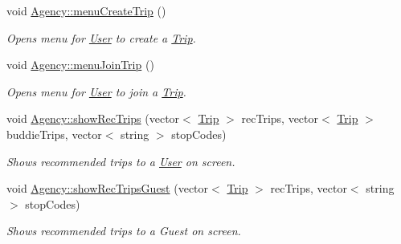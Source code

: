 \begin{DoxyCompactItemize}
\mbox{\label{group___agency_ga07c72d02ed02eac58a0624feb7fccea8}} 
void \hyperlink{group___agency_ga07c72d02ed02eac58a0624feb7fccea8}{Agency\+::menu\+Create\+Trip} ()
\begin{DoxyCompactList}\small\item\em Opens menu for \hyperlink{class_user}{User} to create a \hyperlink{class_trip}{Trip}. \end{DoxyCompactList}\item 
\mbox{\label{group___agency_gab83663afe4fceea7def561cbf3a85c84}} 
void \hyperlink{group___agency_gab83663afe4fceea7def561cbf3a85c84}{Agency\+::menu\+Join\+Trip} ()
\begin{DoxyCompactList}\small\item\em Opens menu for \hyperlink{class_user}{User} to join a \hyperlink{class_trip}{Trip}. \end{DoxyCompactList}\item 
void \hyperlink{group___agency_gabc352c6cad4e22817e2a52a0e756e295}{Agency\+::show\+Rec\+Trips} (vector$<$ \hyperlink{class_trip}{Trip} $>$ rec\+Trips, vector$<$ \hyperlink{class_trip}{Trip} $>$ buddie\+Trips, vector$<$ string $>$ stop\+Codes)
\begin{DoxyCompactList}\small\item\em Shows recommended trips to a \hyperlink{class_user}{User} on screen. \end{DoxyCompactList}\item 
void \hyperlink{group___agency_ga7cde2e6cef7a7e4dbcb84af39a8caa34}{Agency\+::show\+Rec\+Trips\+Guest} (vector$<$ \hyperlink{class_trip}{Trip} $>$ rec\+Trips, vector$<$ string $>$ stop\+Codes)
\begin{DoxyCompactList}\small\item\em Shows recommended trips to a Guest on screen. \end{DoxyCompactList}\end{DoxyCompactItemize}
